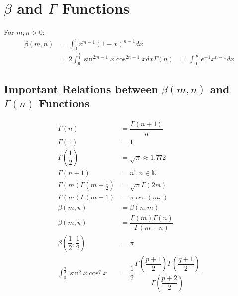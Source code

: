 \documentclass[../main.tex]{subfile}
\begin{document}
    \chapter{$\beta$ and $\Gamma$ Functions}
    For $m,n>0$: 
    \begin{align}
        \beta(m,n) & = \int_0^1 x^{m-1} (1-x)^{n-1} dx&\\
        & = 2 \int_0^{\frac{\pi}{2}} \sin^{2m-1} x \cos^{2n-1} x dx
        \Gamma(n) & = \int_0^\infty e^{-1}x^{n-1} dx
    \end{align}

\section{Important Relations between $\beta(m,n)$ and $\Gamma(n)$ Functions}

\begin{align}
    \Gamma(n) & = \dfrac{\Gamma(n + 1)}{n}\\
    \Gamma(1) & = 1\\
    \Gamma \left( \dfrac{1}{2} \right) & = \sqrt{\pi} \approx 1.772\\
    \Gamma(n + 1) & = n! , n \in \mathbb{N}\\
    \Gamma(m) \Gamma \left( m + \frac{1}{2} \right) & = \sqrt{\pi} \Gamma(2m) \\
    \Gamma(m) \Gamma(m - 1) & = \pi \csc( m \pi)\\
    \beta(m, n) & = \beta(n, m)\\
    \beta(m, n) & = \dfrac{ \Gamma(m) \Gamma(n) }{ \Gamma(m + n) }\\
    \beta \left(\dfrac{1}{2},\dfrac{1}{2}\right) & = \pi\\
    \int_0^{\frac{\pi}{2}} \sin^p x \cos^q x & = \dfrac{1}{2} \dfrac{ \Gamma \left( \dfrac{p + 1}{2} \right) \Gamma \left( \dfrac{q + 1}{2} \right)}{ \Gamma \left( \dfrac{p+2}{2} \right) }\\
\end{align}
\end{document}
